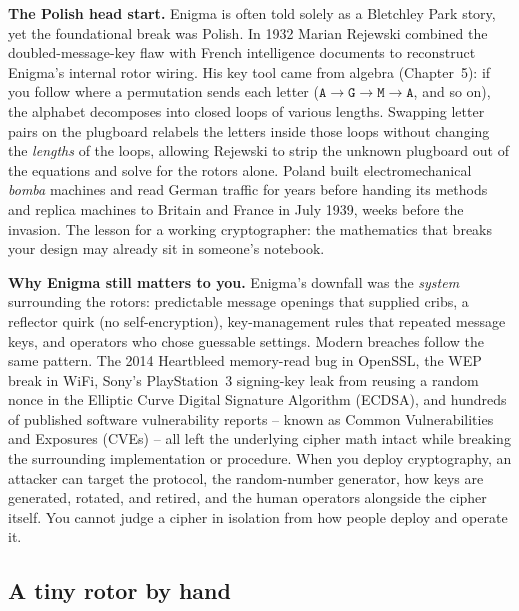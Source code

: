 \begin{focusbox}
\textbf{The Polish head start.} Enigma is often told solely as a Bletchley Park story, yet the
foundational break was Polish. In 1932 Marian Rejewski combined the doubled-message-key flaw
with French intelligence documents to reconstruct Enigma's internal rotor wiring. His key tool
came from algebra (Chapter~5): if you follow where a permutation sends each letter ($\texttt{A}
\to \texttt{G} \to \texttt{M} \to \texttt{A}$, and so on), the alphabet decomposes into closed
loops of various lengths. Swapping letter pairs on the plugboard relabels the letters inside
those loops without changing the \emph{lengths} of the loops, allowing Rejewski to strip the
unknown plugboard out of the equations and solve for the rotors alone. Poland built
electromechanical \emph{bomba} machines and read German traffic for years before handing its
methods and replica machines to Britain and France in July 1939, weeks before the invasion.
The lesson for a working cryptographer: the mathematics that breaks your design may already sit
in someone's notebook.
\end{focusbox}

\begin{applicationbox}
\textbf{Why Enigma still matters to you.} Enigma's downfall was the \emph{system} surrounding
the rotors: predictable message openings that supplied cribs, a reflector quirk (no
self-encryption), key-management rules that repeated message keys, and operators who chose
guessable settings. Modern breaches follow the same pattern. The 2014 Heartbleed memory-read bug
in OpenSSL, the WEP break in WiFi, Sony's PlayStation~3 signing-key leak from reusing a random
nonce in the Elliptic Curve Digital Signature Algorithm (ECDSA), and hundreds of published
software vulnerability reports -- known as Common Vulnerabilities and Exposures (CVEs) -- all
left the underlying cipher math intact while breaking the surrounding implementation or
procedure. When you deploy cryptography, an attacker can target the protocol, the random-number
generator, how keys are generated, rotated, and retired, and the human operators alongside the
cipher itself. You cannot judge a cipher in isolation from how people deploy and operate it.
\end{applicationbox}

\subsection{A tiny rotor by hand}
\label{ch02:toy-rotor}


